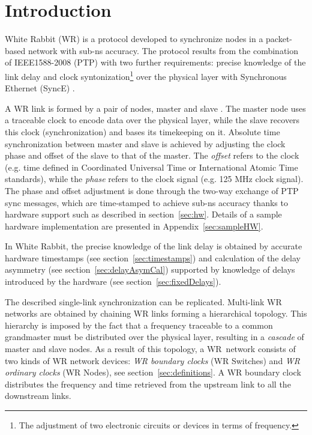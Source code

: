 \documentclass[a4paper, 12pt]{article}
\begin{document}
\newpage

\tableofcontents

\newpage

\section{Introduction}

White Rabbit (WR) is a protocol developed to synchronize nodes in 
a packet-based network with sub-ns accuracy. The protocol results 
from the combination of IEEE1588-2008 (PTP)\cite{IEEE1588} with two further
requirements: precise knowledge of the link delay and clock
syntonization\footnote{The adjustment of two electronic circuits or devices in terms of frequency.} 
over the physical layer with Synchronous Ethernet (SyncE) \cite{SynchE}.

A WR link is formed by a pair of nodes, master and slave 
. The master
node uses a traceable clock to encode data over the physical layer, while the slave
recovers this clock (synchronization) and bases its timekeeping on it. Absolute time
synchronization between master and slave is achieved by adjusting
the clock phase and offset of the slave to that of the master. 
The \textit{offset} refers to the clock (e.g. time defined in Coordinated Universal Time or
International Atomic Time standards), 
while the \textit{phase} refers to the clock signal (e.g. 125 MHz clock signal). 
The phase and offset adjustment is done through the two-way exchange of PTP sync messages, which 
are time-stamped
to achieve sub-ns accuracy thanks to hardware support such as described in section~\ref{sec:hw}.
Details of a sample hardware implementation are presented in 
Appendix~\ref{sec:sampleHW}.

In White Rabbit, the precise knowledge of the link delay is obtained by accurate hardware 
timestamps (see section~\ref{sec:timestamps}) and calculation of the delay asymmetry (see 
section~\ref{sec:delayAsymCal}) supported by knowledge of delays introduced by the hardware (see 
section~\ref{sec:fixedDelays}).

The described single-link synchronization can be replicated. 
Multi-link WR networks are obtained by chaining WR links forming a
hierarchical topology. This hierarchy is imposed by the fact that
a frequency traceable to a common grandmaster must be distributed
over the physical layer, resulting in a \textit{cascade} of master
and slave nodes. As a result of this topology, a WR~network consists of two kinds of WR network 
devices:
\textit{WR boundary clocks} (WR Switches) and \textit{WR ordinary clocks} 
(WR Nodes), see section~\ref{sec:definitions}. A WR boundary clock distributes the frequency 
and time retrieved from the upstream link to all the downstream links.
\end{document}
